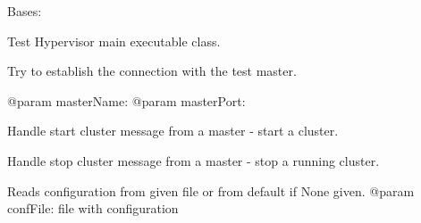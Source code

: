 \documentclass[a4paper,11pt,openany]{sphinxmanual}
\begin{document}
\begin{fulllineitems}
\label{ref-manual/XrdTestHypervisor:XrdTestHypervisor.XrdTestHypervisor}
Bases: {\hyperref[ref-manual/XrdTest:XrdTest.Daemon.Runnable]{}}

Test Hypervisor main executable class.

\begin{fulllineitems}
\label{ref-manual/XrdTestHypervisor:XrdTestHypervisor.XrdTestHypervisor.connectMaster}
Try to establish the connection with the test master.

@param masterName:
@param masterPort:

\end{fulllineitems}


\begin{fulllineitems}
\label{ref-manual/XrdTestHypervisor:XrdTestHypervisor.XrdTestHypervisor.handleStartCluster}
Handle start cluster message from a master - start a cluster.

\end{fulllineitems}


\begin{fulllineitems}
\label{ref-manual/XrdTestHypervisor:XrdTestHypervisor.XrdTestHypervisor.handleStopCluster}
Handle stop cluster message from a master - stop a running cluster.

\end{fulllineitems}


\begin{fulllineitems}
\label{ref-manual/XrdTestHypervisor:XrdTestHypervisor.XrdTestHypervisor.readConfig}
Reads configuration from given file or from default if None given.
@param confFile: file with configuration


\end{fulllineitems}
\end{fulllineitems}
\end{document}
